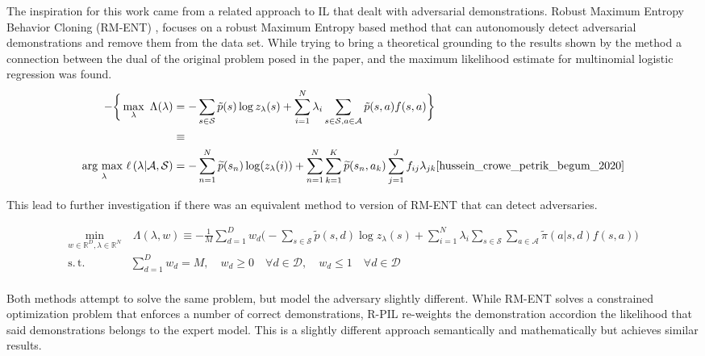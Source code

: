 \documentclass[11pt]{article}
\newcommand{\states}{\mathcal{S}}
\newcommand{\actions}{\mathcal{A}}
\newcommand{\real}{\mathbb{R}}
\newcommand{\argmax}[1]{\underset{#1}{\text{arg max }}}
\begin{document}
\quad The inspiration for this work came from a related approach to IL that dealt with adversarial demonstrations. Robust Maximum Entropy Behavior Cloning (RM-ENT) \cite{hussein_crowe_petrik_begum_2020}, focuses on a robust Maximum Entropy based method that can autonomously detect adversarial demonstrations and remove them from the data set. While trying to bring a theoretical grounding to the results shown by the method a connection between the dual of the original problem posed in the paper, and the maximum likelihood estimate for multinomial logistic regression was found.
\begin{equation}
\begin{aligned}
    -\bigg\{ \max_{\lambda} \ \Lambda(\lambda) &= - \displaystyle\sum_{s \in \mathcal{S}} \tilde{p}(s) \log z_{\lambda}(s) + \displaystyle\sum_{i=1}^N \lambda_{i} \displaystyle\sum_{s \in \mathcal{S} ,a \in \mathcal{A} }\tilde{p}(s,a)f(s,a) \bigg\}
    \\
    &\equiv
    \\
    \argmax{\lambda}\ell \left(\lambda | \mathcal{A}, \mathcal{S} \right) &= - \sum_{n=1}^{N} \widetilde{p}(s_{n}) \log (z_{\lambda}(i)) + \sum_{n=1}^{N} \sum_{k=1}^{K} \widetilde{p}(s_{n}, a_{k}) \sum_{j=1}^{J} f_{ij} \lambda_{jk}\text{\cite{hussein_crowe_petrik_begum_2020}}
\end{aligned}
\end{equation}

This lead to further investigation if there was an equivalent method to version of RM-ENT that can detect adversaries.

\begin{equation}\label{R-dual}
	\begin{aligned}
		\min_{w\in\real^D,\lambda\in\real^N} & \ \Lambda(\lambda,w) \equiv -\frac{1}{M} \sum_{d=1}^D w_{d}  \Big( -\sum_{s \in \states} \tilde{p}(s, d) \log z_{\lambda}(s) + \sum_{i=1}^N \lambda_{i} \sum_{s \in \states}\sum_{a \in \actions} \tilde{\pi}(a\vert s,d) f(s,a)\Big)\\
		\operatorname{s.\,t.} \ \quad & \sum_{d=1}^D w_{d} = M , \quad w_{d} \geq 0 \quad \forall d \in \mathcal{D} , \quad w_{d} \leq 1 \quad \forall d \in \mathcal{D}\\
	\end{aligned}
\end{equation}
			
Both methods attempt to solve the same problem, but model the adversary slightly different. While RM-ENT solves a constrained optimization problem that enforces a number of correct demonstrations, R-PIL  re-weights the demonstration accordion the likelihood that said demonstrations belongs to the expert model. This is a slightly different approach semantically and mathematically but achieves similar results.
\end{document}
